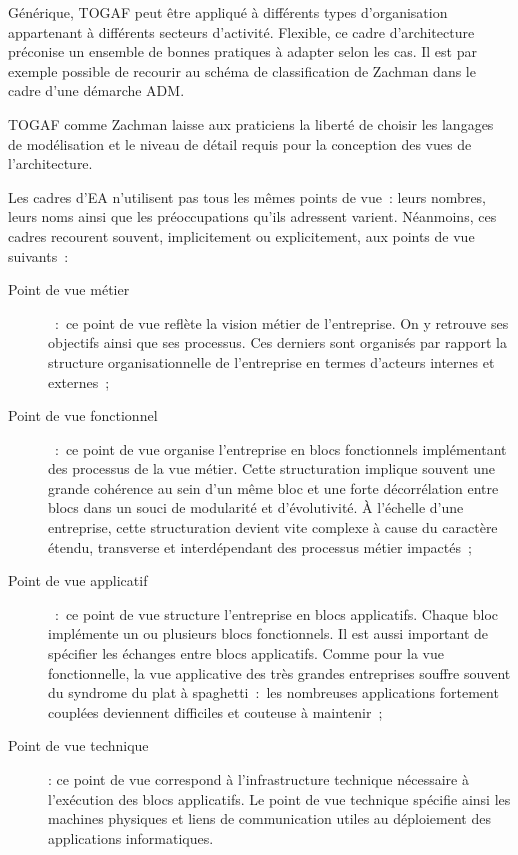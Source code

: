 Générique, TOGAF peut être appliqué à différents types d'organisation appartenant à différents secteurs d'activité. Flexible, ce cadre d'architecture préconise  un ensemble de bonnes pratiques à adapter selon les cas. Il est par exemple possible de recourir au schéma de classification de Zachman dans le cadre d'une démarche ADM.

TOGAF comme Zachman laisse aux praticiens la liberté de choisir les langages de modélisation et le niveau de détail requis pour la conception des vues de l'architecture. 

%
%
%
%
%
%
%


Les cadres d'EA n'utilisent pas tous les mêmes points de vue~: leurs nombres, leurs noms ainsi que les préoccupations qu'ils adressent varient. Néanmoins, ces 
cadres recourent souvent, implicitement ou explicitement, aux points de vue suivants~:

\begin{description}

\item[Point de vue métier]~:~ce point de vue reflète la vision métier de l'entreprise. On y retrouve ses objectifs ainsi que ses processus. Ces derniers  sont organisés par rapport la structure organisationnelle de l'entreprise en termes d'acteurs internes et externes~;

\item[Point de vue fonctionnel]~:~ce point de vue organise l'entreprise en blocs fonctionnels implémentant des processus de la vue métier. Cette structuration implique souvent une grande cohérence au sein d'un même bloc et une forte décorrélation entre blocs dans un souci de modularité et d'évolutivité. À l'échelle d'une entreprise, cette structuration devient vite complexe à cause du caractère étendu, transverse et interdépendant des processus métier impactés~;

\item[Point de vue applicatif]~:~ce point de vue structure l'entreprise en blocs applicatifs. Chaque bloc implémente un ou plusieurs blocs fonctionnels. Il est aussi important de spécifier les échanges entre blocs applicatifs. Comme pour la vue fonctionnelle, la vue applicative des très grandes entreprises souffre souvent du syndrome du plat à spaghetti~:~les nombreuses applications fortement couplées deviennent difficiles et couteuse à maintenir~;

\item[Point de vue technique] : ce point de vue correspond à l'infrastructure technique nécessaire à l'exécution des blocs applicatifs. Le point de vue technique spécifie ainsi les machines physiques et liens de communication utiles au déploiement des applications informatiques. 
\end{description}

